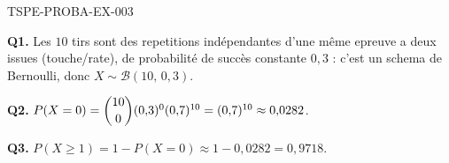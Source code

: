 \begin{corrige}{TSPE-PROBA-EX-003}

\textbf{Q1.} Les $10$ tirs sont des repetitions indépendantes d'une même epreuve a deux issues (touche/rate), de probabilité de succès constante $0{,}3$ : c'est un schema de Bernoulli, donc $X \sim \mathcal{B}(10,\,0{,}3)$.

\textbf{Q2.} $P(X=0) = \dbinom{10}{0}(0{,}3)^0(0{,}7)^{10} = (0{,}7)^{10} \approx 0{,}0282$.

\textbf{Q3.} $P(X\geq 1) = 1-P(X=0) \approx 1-0{,}0282 = \boxed{0{,}9718}$.

\end{corrige}
